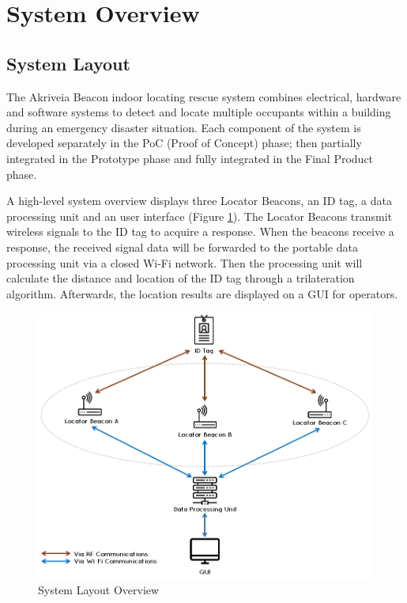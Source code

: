 

\setcounter{section}{1}
\section{System Overview}
\bigskip
\subsection{System Layout}
\medskip
The Akriveia Beacon indoor locating rescue system combines electrical, hardware and software systems to detect and locate multiple occupants within a building during an emergency disaster situation. Each component of the system is developed separately in the PoC (Proof of Concept) phase; then partially integrated in the Prototype phase and fully integrated in the Final Product phase.

\bigskip
A high-level system overview displays three Locator Beacons, an ID tag, a data processing unit and an user interface (Figure \ref{fig:system_layout}). The Locator Beacons transmit wireless signals to the ID tag to acquire a response. When the beacons receive a response, the received signal data will be forwarded to the portable data processing unit via a closed Wi-Fi network. Then the processing unit will calculate the distance and location of the ID tag through a trilateration algorithm. Afterwards, the location results are displayed on a \Gls{GUI} for operators.

\begin{figure}[h!]
    \centering
    \includegraphics[width=\linewidth]{./images/00_sys_arch.png}
    \caption{System Layout Overview}
    \label{fig:system_layout}
\end{figure}


